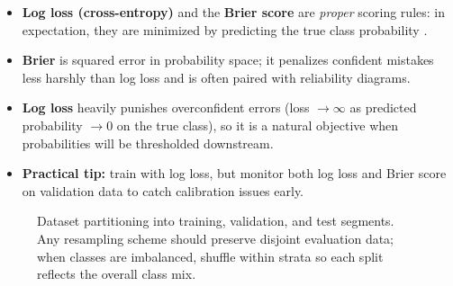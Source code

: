 \begin{tcolorbox}[summarybox, title={Proper scoring rules and calibration}, breakable]
\small
\begin{itemize}
    \item \textbf{Log loss (cross\hyp{}entropy)} and the \textbf{Brier score} are \emph{proper} scoring rules: in expectation, they are minimized by predicting the true class probability \citep{Brier1950,Gneiting2007}.
    \item \textbf{Brier} is squared error in probability space; it penalizes confident mistakes less harshly than log loss and is often paired with reliability diagrams.
    \item \textbf{Log loss} heavily punishes overconfident errors (loss \(\to \infty\) as predicted probability \(\to 0\) on the true class), so it is a natural objective when probabilities will be thresholded downstream.
    \item \textbf{Practical tip:} train with log loss, but monitor both log loss and Brier score on validation data to catch calibration issues early.
\end{itemize}
\normalsize
\end{tcolorbox}


\begin{figure}[h]
    \centering
{}
    \caption{Dataset partitioning into training, validation, and test segments. Any resampling scheme should preserve disjoint evaluation data; when classes are imbalanced, shuffle within strata so each split reflects the overall class mix.}
    \label{fig:lec1_splits}
\end{figure}


